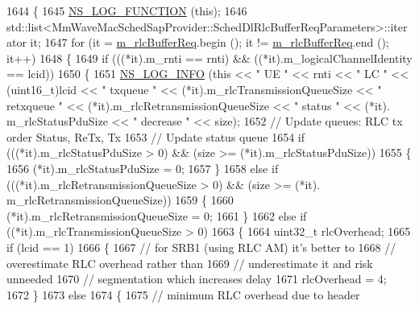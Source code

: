 \begin{DoxyCode}
1644 \{
1645   \hyperlink{log-macros-disabled_8h_a90b90d5bad1f39cb1b64923ea94c0761}{NS\_LOG\_FUNCTION} (\textcolor{keyword}{this});
1646   std::list<MmWaveMacSchedSapProvider::SchedDlRlcBufferReqParameters>::iterator it;
1647   \textcolor{keywordflow}{for} (it = \hyperlink{classns3_1_1MmWaveRrMacScheduler_a4808ca626b0b12682c3f1a079d016997}{m\_rlcBufferReq}.begin (); it != \hyperlink{classns3_1_1MmWaveRrMacScheduler_a4808ca626b0b12682c3f1a079d016997}{m\_rlcBufferReq}.end (); it++)
1648     \{
1649       \textcolor{keywordflow}{if} (((*it).m\_rnti == rnti) && ((*it).m\_logicalChannelIdentity == lcid))
1650         \{
1651           \hyperlink{group__logging_gafbd73ee2cf9f26b319f49086d8e860fb}{NS\_LOG\_INFO} (\textcolor{keyword}{this} << \textcolor{stringliteral}{" UE "} << rnti << \textcolor{stringliteral}{" LC "} << (uint16\_t)lcid << \textcolor{stringliteral}{" txqueue "} << 
      (*it).m\_rlcTransmissionQueueSize << \textcolor{stringliteral}{" retxqueue "} << (*it).m\_rlcRetransmissionQueueSize << \textcolor{stringliteral}{" status "} << (*it).
      m\_rlcStatusPduSize << \textcolor{stringliteral}{" decrease "} << size);
1652           \textcolor{comment}{// Update queues: RLC tx order Status, ReTx, Tx}
1653           \textcolor{comment}{// Update status queue}
1654            \textcolor{keywordflow}{if} (((*it).m\_rlcStatusPduSize > 0) && (size >= (*it).m\_rlcStatusPduSize))
1655               \{
1656                 (*it).m\_rlcStatusPduSize = 0;
1657               \}
1658             \textcolor{keywordflow}{else} \textcolor{keywordflow}{if} (((*it).m\_rlcRetransmissionQueueSize > 0) && (size >= (*it).
      m\_rlcRetransmissionQueueSize))
1659               \{
1660                 (*it).m\_rlcRetransmissionQueueSize = 0;
1661               \}
1662             \textcolor{keywordflow}{else} \textcolor{keywordflow}{if} ((*it).m\_rlcTransmissionQueueSize > 0)
1663               \{
1664                 uint32\_t rlcOverhead;
1665                 \textcolor{keywordflow}{if} (lcid == 1)
1666                   \{
1667                     \textcolor{comment}{// for SRB1 (using RLC AM) it's better to}
1668                     \textcolor{comment}{// overestimate RLC overhead rather than}
1669                     \textcolor{comment}{// underestimate it and risk unneeded}
1670                     \textcolor{comment}{// segmentation which increases delay}
1671                     rlcOverhead = 4;
1672                   \}
1673                 \textcolor{keywordflow}{else}
1674                   \{
1675                     \textcolor{comment}{// minimum RLC overhead due to header}

\end{DoxyCode}
